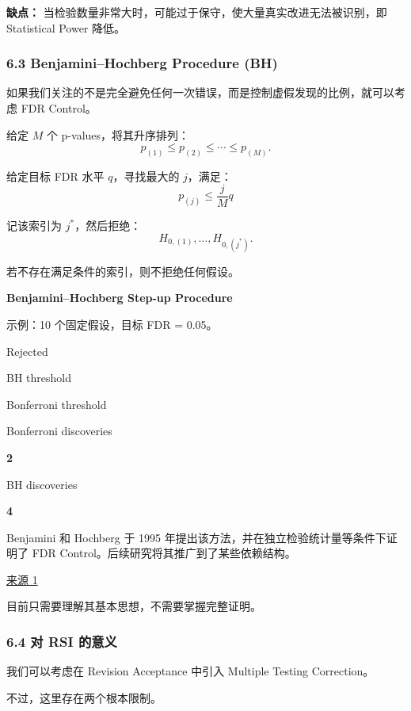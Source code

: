 \textbf{缺点：} 当检验数量非常大时，可能过于保守，使大量真实改进无法被识别，即 Statistical Power 降低。

\hypertarget{part-2-16-0001-benjaminihochberg-procedure-bh}{%
\subsubsection{6.3 Benjamini--Hochberg Procedure (BH)}\label{part-2-16-0001-benjaminihochberg-procedure-bh}}

如果我们关注的不是完全避免任何一次错误，而是控制虚假发现的比例，就可以考虑 FDR Control。

给定 \(M\) 个 p-values，将其升序排列：
\[p_{(1)}\leq p_{(2)}
\leq\cdots\leq p_{(M)}.\]

给定目标 FDR 水平 \(q\)，寻找最大的 \(j\)，满足：
\[\boxed{
p_{(j)}\leq\frac{j}{M}q
}\]

记该索引为 \(j^*\)，然后拒绝：
\[H_{0,(1)},\ldots,H_{0,(j^*)}.\]

若不存在满足条件的索引，则不拒绝任何假设。

\textbf{Benjamini--Hochberg Step-up Procedure}

示例：10 个固定假设，目标 FDR = 0.05。


Rejected

BH threshold

Bonferroni threshold

Bonferroni discoveries

\textbf{2}

BH discoveries

\textbf{4}

Benjamini 和 Hochberg 于 1995 年提出该方法，并在独立检验统计量等条件下证明了 FDR Control。后续研究将其推广到了某些依赖结构。

\href{https://academic.oup.com/jrsssb/article/57/1/289/7035855?login=false}{来源 1}

目前只需要理解其基本思想，不需要掌握完整证明。

\hypertarget{part-2-16-0001-ux5bf9-rsi-ux7684ux610fux4e49}{%
\subsubsection{6.4 对 RSI 的意义}\label{part-2-16-0001-ux5bf9-rsi-ux7684ux610fux4e49}}

我们可以考虑在 Revision Acceptance 中引入 Multiple Testing Correction。

不过，这里存在两个根本限制。

